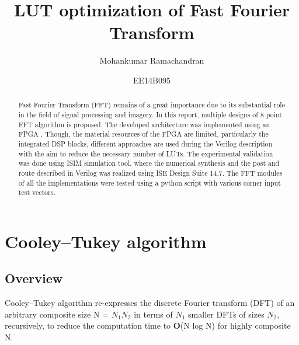 \documentclass{article}
\begin{document}
\title{ LUT optimization of Fast Fourier Transform }
\author{ Mohankumar Ramachandran }
\author{ EE14B095 }

\maketitle

\begin{abstract}
Fast Fourier Transform (FFT) remains of a great importance due to its substantial role in the field of signal processing and imagery. In this report, multiple designs of 8 point FFT  algorithm is proposed. The developed architecture was implemented using an FPGA . Though, the material resources of the FPGA are limited, particularly the integrated DSP blocks, different approaches are used during the Verilog description with the aim to reduce the necessary number of LUTs. The experimental validation was done using ISIM simulation tool, where the numerical synthesis and the post and route described in Verilog was realized using ISE Design Suite 14.7. The FFT modules of all the implementations were tested using a python script with various corner input test vectors.
\end{abstract}


\section{Cooley–Tukey algorithm }
\label{raw_Cooley_Tukey_algorithm}

\subsection{Overview}
Cooley–Tukey algorithm re-expresses the discrete Fourier transform (DFT) of an arbitrary composite size N = $N_1N_2$ in terms of $N_1$ smaller DFTs of sizes $N_2$, recursively, to reduce the computation time to \textbf{O}(N log N) for highly composite N.
\end{document}
